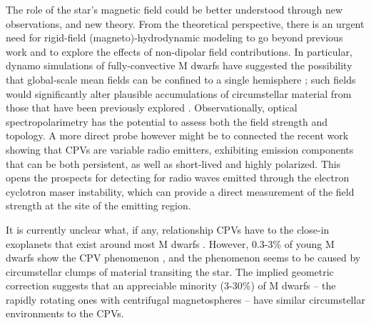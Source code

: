 \documentclass{nature3}
\begin{document}
The role of the star's magnetic field could be better understood
through new observations, and new theory.  From the theoretical
perspective, there is an urgent need for rigid-field
(magneto)-hydrodynamic modeling to go beyond previous work
\cite{Townsend2005,Townsend2008} and to explore the effects of
non-dipolar field contributions.
In particular, dynamo simulations of fully-convective M dwarfs have
suggested the possibility that global-scale mean fields can be
confined to a single hemisphere \cite{Brown2020}; such fields would
significantly alter plausible accumulations of circumstellar material
from those that have been previously explored \cite{Townsend2008}.
Observationally, optical spectropolarimetry has the potential to
assess both the field strength and topology.  A more direct probe
however might be to connected the recent work \cite{Kaur2024} showing
that CPVs are variable radio emitters, exhibiting emission components
that can be both persistent, as well as short-lived and highly
polarized.  This opens the prospects for detecting for radio waves
emitted through the electron cyclotron maser instability, which can
provide a direct measurement of the field strength at the site of the
emitting region.

It is currently unclear what, if any, relationship CPVs have to the
close-in exoplanets that exist around most M dwarfs
\cite{Dressing2015}.  However, 0.3-3\% of young M dwarfs show the CPV
phenomenon \cite{Rebull2020}, and the phenomenon seems to be caused by
circumstellar clumps of material transiting the star.  The implied
geometric correction suggests that an appreciable minority (3-30\%) of
M dwarfs -- the rapidly rotating ones with centrifugal magnetospheres
-- have similar circumstellar environments to the CPVs.




\end{document}
